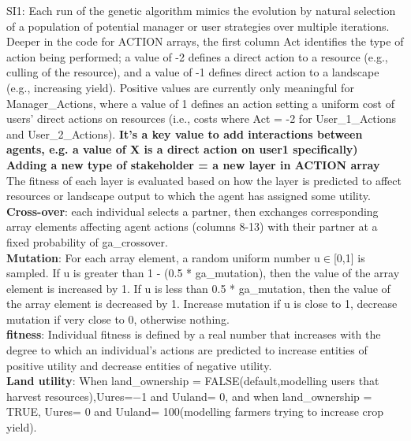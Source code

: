 \documentclass[12pt]{article}
\begin{document}
SI1:  Each  run  of  the  genetic  algorithm  mimics  the evolution  by  natural  selection  of  a  population  of  potential  manager  or  user  strategies  over  multiple  iterations.\\
Deeper in the code for ACTION arrays, the  first  column Act identifies the  type  of  action  being  performed;  a  value  of  -2  defines  a  direct  action  to  a  resource  (e.g.,  culling  of  the resource),  and  a  value  of  -1  defines  direct  action  to  a  landscape  (e.g.,  increasing  yield).  Positive  values  are currently  only  meaningful  for Manager\_Actions,  where  a  value  of  1  defines  an  action  setting  a  uniform  cost of  users’  direct  actions  on  resources  (i.e.,  costs  where Act  =  -2 for User\_1\_Actions and User\_2\_Actions). \textbf{It's a key value to add interactions between agents, e.g. a value of X is a direct action on user1 specifically)}\\
\textbf{Adding a new type of stakeholder = a new layer in ACTION array}\\
The  fitness  of  each  layer  is evaluated  based  on  how  the  layer  is  predicted  to  affect  resources  or  landscape  output  to  which  the  agent  has assigned  some  utility. \\
\textbf{Cross-over}:  each individual  selects  a  partner,  then  exchanges  corresponding  array  elements  affecting  agent  actions  (columns 8-13)  with  their  partner  at  a  fixed  probability  of ga\_crossover.\\
\textbf{Mutation}:  For  each  array  element,  a  random  uniform  number u$\in$[0,1] is  sampled.  If u is greater than 1  -  (0.5  *  ga\_mutation),  then  the  value  of  the  array  element  is  increased  by  1.  If u is  less than 0.5  *  ga\_mutation,  then  the  value  of  the  array  element  is  decreased  by  1. Increase mutation if u is close to 1, decrease mutation if very close to 0, otherwise nothing. \\
\textbf{fitness}:  Individual fitness  is  defined  by  a  real  number  that  increases  with  the  degree  to  which  an  individual’s  actions  are  predicted  to  increase  entities  of  positive  utility  and  decrease  entities  of  negative  utility.\\
\textbf{Land utility}: When land\_ownership  =  FALSE(default,modelling  users  that  harvest  resources),Uures=−1 and Uuland=  0,  and  when land\_ownership  =  TRUE, Uures=  0 and Uuland=  100(modelling  farmers  trying  to  increase  crop  yield).
\end{document}
